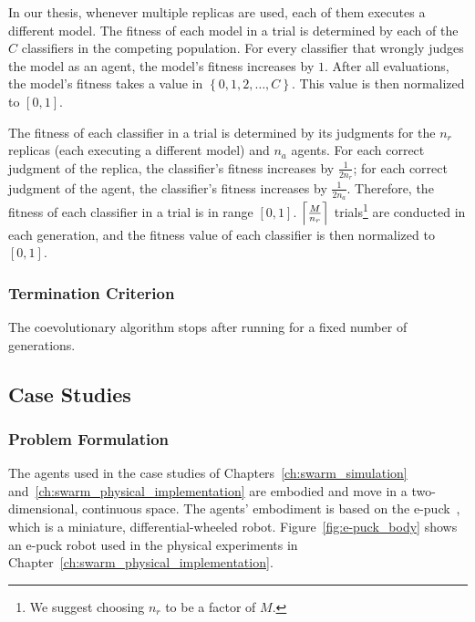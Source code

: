 In our thesis, whenever multiple replicas are used, each of them executes a different model. The fitness of each model in a trial is determined by each of the $C$ classifiers in the competing population. For every classifier that wrongly judges the model as an agent, the model's fitness increases by $1$. After all evaluations, the model's fitness takes a value in $\left\{0, 1, 2, \dots, C \right\}$. This value is then normalized to $[0, 1]$. 

The fitness of each classifier in a trial is determined by its judgments for the $n_r$ replicas (each executing a different model) and $n_a$ agents. For each correct judgment of the replica, the classifier's fitness increases by $\frac{1}{2 n_r}$; for each correct judgment of the agent, the classifier's fitness increases by $\frac{1}{2 n_a}$. Therefore, the fitness of each classifier in a trial is in range $[0, 1]$. $\ceil*{\frac{M}{n_r}}$ trials\footnote{We suggest choosing $n_r$ to be a factor of $M$.} are conducted in each generation, and the fitness value of each classifier is then normalized to $[0, 1]$.

\subsubsection{Termination Criterion}

The coevolutionary algorithm stops after running for a fixed number of generations.

\subsection{Case Studies}\label{sec:case_studies_swarm_simulation}

\subsubsection{Problem Formulation}
The agents used in the case studies of Chapters~\ref{ch:swarm_simulation} and~\ref{ch:swarm_physical_implementation} are embodied and move in a two-dimensional, continuous space. The agents' embodiment is based on the e-puck~\cite{e-puck}, which is a miniature, differential-wheeled robot. Figure~\ref{fig:e-puck_body} shows an e-puck robot used in the physical experiments in Chapter~\ref{ch:swarm_physical_implementation}. 

